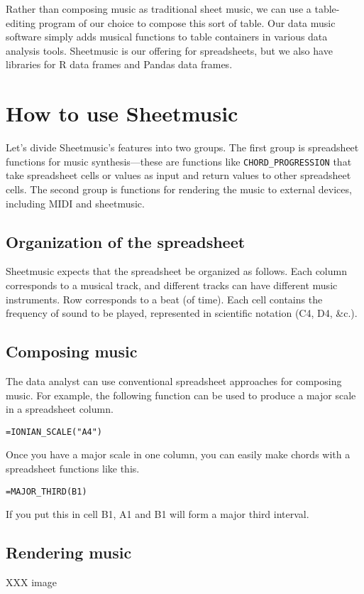 \documentclass{acm_proc_article-sp}
\begin{document}
Rather than composing music as traditional sheet music,
we can use a table-editing program of our choice to compose
this sort of table. Our data music software simply adds
musical functions to table containers in various data analysis
tools. Sheetmusic is our offering for spreadsheets, but we
also have libraries for R data frames\cite{ddr} and Pandas
data frames.\cite{ddpy}

\section{How to use Sheetmusic}
Let's divide Sheetmusic's features into two groups. The first group
is spreadsheet functions for music synthesis---these are functions
like \texttt{CHORD_PROGRESSION} that take spreadsheet cells or values
as input and return values to other spreadsheet cells. The second
group is functions for rendering the music to external devices,
including MIDI and sheetmusic.

\subsection{Organization of the spreadsheet}
Sheetmusic expects that the spreadsheet be organized as follows.
Each column corresponds
to a musical track, and different tracks can have different music instruments.
Row corresponds to a beat (of time).
Each cell contains the frequency of sound to be played, represented
in scientific notation (C4, D4, \&c.).

\subsection{Composing music}
The data analyst can use conventional spreadsheet approaches for
composing music. For example, the following function can be used
to produce a major scale in a spreadsheet column.

\begin{verbatim}
=IONIAN_SCALE("A4")
\end{verbatim}

Once you have a major scale in one column, you can easily make
chords with a spreadsheet functions like this.
\begin{verbatim}
=MAJOR_THIRD(B1)
\end{verbatim}
If you put this in cell B1, A1 and B1 will form a major third interval.

\subsection{Rendering music}
XXX image
\end{document}
